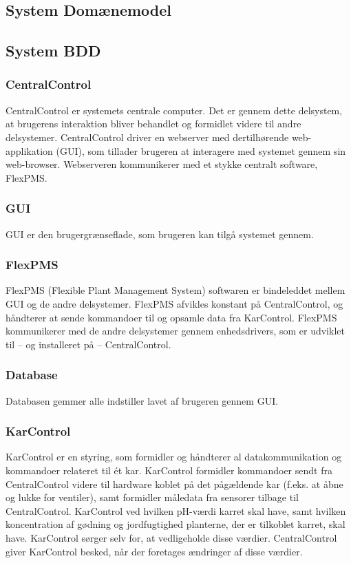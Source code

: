 
\subsection{System Domænemodel}

\subsection{System BDD}

\subsubsection{CentralControl}
CentralControl er systemets centrale computer. Det er gennem dette delsystem, at brugerens interaktion bliver behandlet og formidlet videre til andre delsystemer. CentralControl driver en webserver med dertilhørende web-applikation (GUI), som tillader brugeren at interagere med systemet gennem sin web-browser. Webserveren kommunikerer med et stykke centralt software, FlexPMS.

\subsubsection{GUI}
GUI er den brugergrænseflade, som brugeren kan tilgå systemet gennem.

\subsubsection{FlexPMS}
FlexPMS (Flexible Plant Management System) softwaren er bindeleddet mellem GUI og de andre delsystemer. FlexPMS afvikles konstant på CentralControl, og håndterer at sende kommandoer til og opsamle data fra KarControl. FlexPMS kommunikerer med de andre delsystemer gennem enhedsdrivers, som er udviklet til – og installeret på – CentralControl.

\subsubsection{Database}
Databasen gemmer alle indstiller lavet af brugeren gennem GUI.

\subsubsection{KarControl}
KarControl er en styring, som formidler og håndterer al datakommunikation og kommandoer relateret til ét kar. KarControl formidler kommandoer sendt fra CentralControl videre til hardware koblet på det pågældende kar (f.eks. at åbne og lukke for ventiler), samt formidler måledata fra sensorer tilbage til CentralControl. KarControl ved hvilken pH-værdi karret skal have, samt hvilken koncentration af gødning og jordfugtighed planterne, der er tilkoblet karret, skal have. KarControl sørger selv for, at vedligeholde disse værdier. CentralControl giver KarControl besked, når der foretages ændringer af disse værdier.


